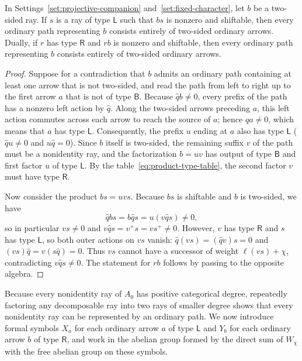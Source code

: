 \begin{lemma}
\label{lem:two-sided-factor-paths}
In Settings~\ref{set:projective-companion} and~\ref{set:fixed-character}, let $b$ be a two-sided ray. If $s$ is a ray of type $\mathsf L$ such that $bs$ is nonzero and shiftable, then every ordinary path representing $b$ consists entirely of two-sided ordinary arrows. Dually, if $r$ has type $\mathsf R$ and $rb$ is nonzero and shiftable, then every ordinary path representing $b$ consists entirely of two-sided ordinary arrows.
\end{lemma}
\begin{proof}
Suppose for a contradiction that $b$ admits an ordinary path containing at least one arrow that is not two-sided, and read the path from left to right up to the first arrow $a$ that is not of type $\mathsf B$. Because $\widehat q b\ne0$, every prefix of the path has a nonzero left action by $\widehat q$. Along the two-sided arrows preceding $a$, this left action commutes across each arrow to reach the source of $a$; hence $\widehat q a\ne0$, which means that $a$ has type $\mathsf L$. Consequently, the prefix $u$ ending at $a$ also has type $\mathsf L$ ($\widehat q u\ne0$ and $u\widehat q=0$). Since $b$ itself is two-sided, the remaining suffix $v$ of the path must be a nonidentity ray, and the factorization $b=uv$ has output of type $\mathsf B$ and first factor $u$ of type $\mathsf L$. By the table~\eqref{eq:product-type-table}, the second factor $v$ must have type $\mathsf R$.

Now consider the product $bs=uvs$. Because $bs$ is shiftable and $b$ is two-sided, we have
\[
  \widehat q bs=b\widehat q s=u(v\widehat q s)\ne0,
\]
so in particular $vs\ne0$ and $v\widehat q s=v^+s=vs^+\ne0$. However, $v$ has type $\mathsf R$ and $s$ has type $\mathsf L$, so both outer actions on $vs$ vanish: $\widehat q(vs)=(\widehat q v)s=0$ and $(vs)\widehat q=v(s\widehat q)=0$. Thus $vs$ cannot have a successor of weight $\ell(vs)+\chi$, contradicting $v\widehat q s\ne0$. The statement for $rb$ follows by passing to the opposite algebra.
\end{proof}

Because every nonidentity ray of $A_0$ has positive categorical degree, repeatedly factoring any decomposable ray into two rays of smaller degree shows that every nonidentity ray can be represented by an ordinary path. We now introduce formal symbols $X_a$ for each ordinary arrow $a$ of type $\mathsf L$ and $Y_b$ for each ordinary arrow $b$ of type $\mathsf R$, and work in the abelian group formed by the direct sum of $W_\chi$ with the free abelian group on these symbols.

